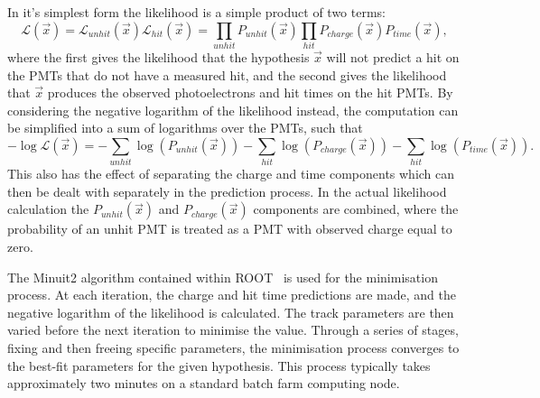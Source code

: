 In it's simplest form the likelihood is a simple product of two terms:
\begin{equation} %
    \mathcal{L}(\vec{x})=\mathcal{L}_{unhit}(\vec{x})\mathcal{L}_{hit}(\vec{x})=
    \prod_{unhit}P_{unhit}(\vec{x})\prod_{hit}P_{charge}(\vec{x})P_{time}(\vec{x}),
    \label{eq:likelihood}
\end{equation}
where the first gives the likelihood that the hypothesis $\vec{x}$ will not predict a hit on the
PMTs that do not have a measured hit, and the second gives the likelihood that $\vec{x}$ produces
the observed photoelectrons and hit times on the hit PMTs. By considering the negative logarithm
of the likelihood instead, the computation can be simplified into a sum of logarithms over the
PMTs, such that
\begin{equation} %
    -\log\mathcal{L}(\vec{x})=
    -\sum_{unhit}\log(P_{unhit}(\vec{x}))
    -\sum_{hit}\log(P_{charge}(\vec{x}))
    -\sum_{hit}\log(P_{time}(\vec{x})).
    \label{eq:likelihood_sum}
\end{equation}
This also has the effect of separating the charge and time components which can then be dealt with
separately in the prediction process. In the actual likelihood calculation the
$P_{unhit}(\vec{x})$ and $P_{charge}(\vec{x})$ components are combined, where the probability of
an unhit PMT is treated as a PMT with observed charge equal to zero.

The Minuit2 algorithm contained within ROOT~\cite{brun1997} is used for the minimisation process.
At each iteration, the charge and hit time predictions are made, and the negative logarithm of the
likelihood is calculated. The track parameters are then varied before the next iteration to
minimise the value. Through a series of stages, fixing and then freeing specific parameters, the
minimisation process converges to the best-fit parameters for the given hypothesis. This process
typically takes approximately two minutes on a standard batch farm computing node.


